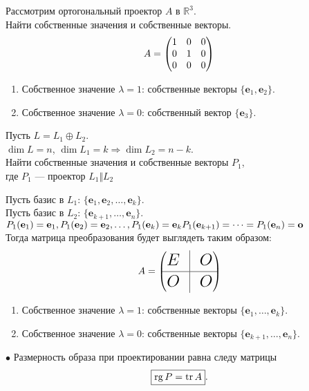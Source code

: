 \begin{prim}
Рассмотрим ортогональный проектор $A$ в $\mathbb {R}^3$.\\
Найти собственные значения и собственные векторы. 
$$A =
	\begin{pmatrix*}[r]
	1 & 0 & 0\\
	0 & 1 & 0\\
	0 & 0 & 0\\
    \end{pmatrix*}\\
$$
\end{prim}
\vspace{-0.5cm}
\begin{enumerate}
	\item Собственное значение $\lambda = 1$: собственные векторы $\{\textbf{e$_1$}, \textbf{e$_2$}\}. $
	\item Собственное значение $\lambda = 0$: собственный вектор $\{\textbf{e$_3$}\}. $ 
\end{enumerate}
\begin{prim}
Пусть $L = L_1 \oplus L_2$. \\
$\dim L = n$, $\dim L_{1} = k \Rightarrow \dim L_{2} = n - k$.\\
Найти собственные значения и собственные векторы $P_1$,\\
где $P_1$ --- проектор $L_1 \Vert L_2$
\end{prim}
Пусть базис в $L_1$: $\{\textbf{e$_1$}, \textbf{e$_2$},\dots, \textbf{e$_k$}\}$.\\
Пусть базис в $L_2$: $\{\textbf{e$_{k+1}$},\dots, \textbf{e$_n$}\}$.\\
$P_1 (\textbf{e$_1$}) = \textbf{e$_1$}, P_1(\textbf{e$_2$}) = \textbf{e$_2$}, \dots, P_1 (\textbf{e$_k$}) = \textbf{e$_k$}\\
P_1(\textbf{e$_{k+1}$})=\dots=P_1(\textbf{e$_n$})=\textbf{o}
$\\
Тогда матрица преобразования будет выглядеть таким образом:
$$A =
{\LARGE
	\begin{pmatrix*}[r]
	E & \vline & O\\ \hline
	O & \vline & O \\
	\end{pmatrix*}}$$
\begin{enumerate}
	\item Собственное значение $\lambda = 1$: собственные векторы $\{\textbf{e$_1$},\dots, \textbf{e$_k$}\}$.
	\item Собственное значение $\lambda = 0$: собственные векторы $\{\textbf{e$_{k+1}$} ,\dots, \textbf{e$_n$}\}$.
\end{enumerate}

$\bullet$  Размерность образа при проектировании равна следу матрицы $$\boxed {\operatorname{\mathop{rg}} P = \operatorname{\mathop{tr}} A}.$$
